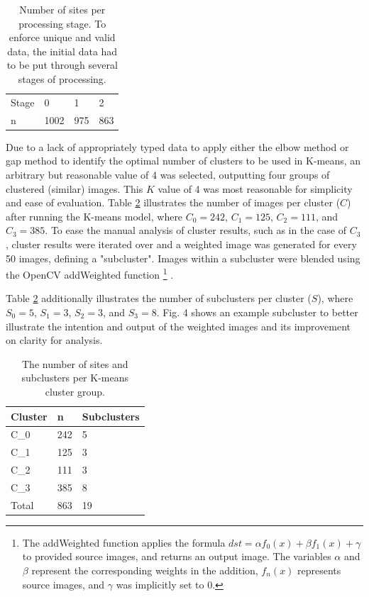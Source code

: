 \documentclass[conference]{IEEEtran}
\begin{document}
\begin{table}[h]
\centering
\caption{Number of sites per processing stage. To enforce unique and valid data, the initial data had to be put through several stages of processing.}
\label{tab:stages}
\begin{tabular}{@{}llll@{}}
\toprule
Stage & 0    & 1   & 2   \\
n     & 1002 & 975 & 863 \\ \bottomrule
\end{tabular}
\end{table}

Due to a lack of appropriately typed data to apply either the elbow method \cite{elbow} or gap method \cite{gap} to identify the optimal number of clusters to be used in K-means, an arbitrary but reasonable value of 4 was selected, outputting four groups of clustered (similar) images. This \(K\) value of 4 was most reasonable for simplicity and ease of evaluation. Table \ref{tab:clusters} illustrates the number of images per cluster (\(C\)) after running the K-means model, where \(C_0 = 242\), \(C_1 = 125\), \(C_2 = 111\), and \(C_3 = 385\). To ease the manual analysis of cluster results, such as in the case of \(C_3\), cluster results were iterated over and a weighted image was generated for every 50 images, defining a "subcluster". Images within a subcluster were blended using the OpenCV addWeighted function \footnote{The addWeighted function applies the formula \(dst = \alpha f_0(x) + \beta f_1(x) + \gamma\) to provided source images, and returns an output image. The variables \(\alpha\) and \(\beta\) represent the corresponding weights in the addition, \(f_n(x)\) represents source images, and \(\gamma\) was implicitly set to 0.} \cite{cv2addweighted}.

Table \ref{tab:clusters} additionally illustrates the number of subclusters per cluster (\(S\)), where \(S_0 = 5\), \(S_1 = 3\), \(S_2 = 3\), and \(S_3 = 8\). Fig. 4 shows an example subcluster to better illustrate the intention and output of the weighted images and its improvement on clarity for analysis.

\begin{table}[h]
\centering
\caption{The number of sites and subclusters per K-means cluster group.}
\label{tab:clusters}
\begin{tabular}{@{}lll@{}}
\toprule
Cluster & n  & Subclusters \\ \midrule
C_0    & 242 & 5      \\
C_1    & 125 & 3      \\
C_2    & 111 & 3      \\
C_3    & 385 & 8      \\
Total & 863 & 19     \\ \bottomrule
\end{tabular}
\end{table}
\end{document}
